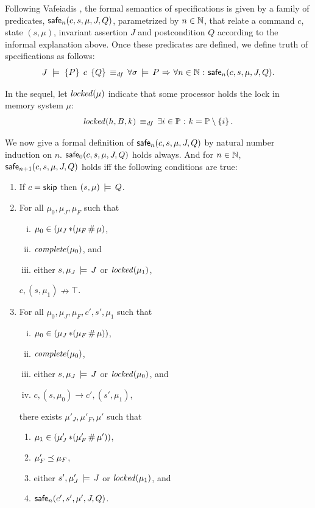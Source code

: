 \documentclass[11pt]{article}
\begin{document}
Following Vafeiadis \cite{V11}, the formal semantics of specifications is given by a family of predicates, $\mathsf{safe}_{n}(c,s,\mu,J,Q)$, parametrized by $n \in \mathbb{N}$, that relate a command $c$, state $(s,\mu)$, invariant assertion $J$ and postcondition $Q$ according to the informal explanation above. Once these predicates are defined, we define truth of specifications as follows: \[ J\;\models\;\left\lbrace P \right\rbrace\;c\;\left\lbrace Q \right\rbrace \operatorname{\;\equiv_{\mathit{df}}\;} \forall \sigma \,\models\, P \operatorname{\,\Rightarrow\,} \forall n \in \mathbb{N} \operatorname{\,:\,} \mathsf{safe}_{n}(c,s,\mu,J,Q).\]

In the sequel, let $\mathit{locked}(\mu)$ indicate that some processor holds the lock in memory system $\mu$: \[ \mathit{locked}(h,B,k) \operatorname{\;\equiv_{\mathit{df}}\;} \exists i \in \mathbb{P} \operatorname{\,:\,} k = \mathbb{P} \setminus \left\lbrace i \right\rbrace. \]

We now give a formal definition of $\mathsf{safe}_{n}(c,s,\mu,J,Q)$ by natural number induction on $n$. $\mathsf{safe}_{0}(c,s,\mu,J,Q)$ holds always. And for $n \in \mathbb{N}$, $\mathsf{safe}_{n+1}(c,s,\mu,J,Q)$ holds iff the following conditions are true: \begin{enumerate}
	\item If $c = \operatorname{\mathsf{skip}}$ then $(s,\mu) \,\models\, Q$.

	\item For all $\mu_0,\mu_J,\mu_F$ such that \begin{enumerate}[(i)]
		\item $\mu_0 \in (\mu_J \operatorname{\ast} (\mu_F \operatorname{\#} \mu)$,
		\item $\mathit{complete}(\mu_0)$, and
		\item either $s,\mu_J \,\models\, J$ or $\mathit{locked}(\mu_1)$,
	\end{enumerate} $c,(s,\mu_1) \nrightarrow \top$.

	\item For all $\mu_0,\mu_J,\mu_F,c',s',\mu_1$ such that \begin{enumerate}[(i)]
		\item $\mu_0 \in (\mu_J \operatorname{\ast} (\mu_F \operatorname{\#} \mu))$,
		\item $\mathit{complete}(\mu_0)$,
		\item either $s,\mu_J \,\models\, J$ or $\mathit{locked}(\mu_0)$, and 
		\item $c,(s,\mu_0) \rightarrow c',(s',\mu_1)$,
	\end{enumerate} there exists $\mu'_J,\mu'_F,\mu'$ such that \begin{enumerate}
		\item $\mu_1 \in (\mu'_J \operatorname{\ast} (\mu'_F \operatorname{\#} \mu'))$,
		\item $\mu'_F \preceq \mu_F$,
		\item either $s',\mu'_J \,\models\, J$ or $\mathit{locked}(\mu_1)$, and
		\item $\mathsf{safe}_{n}(c',s',\mu',J,Q)$.
	\end{enumerate}

\end{enumerate}
\end{document}
